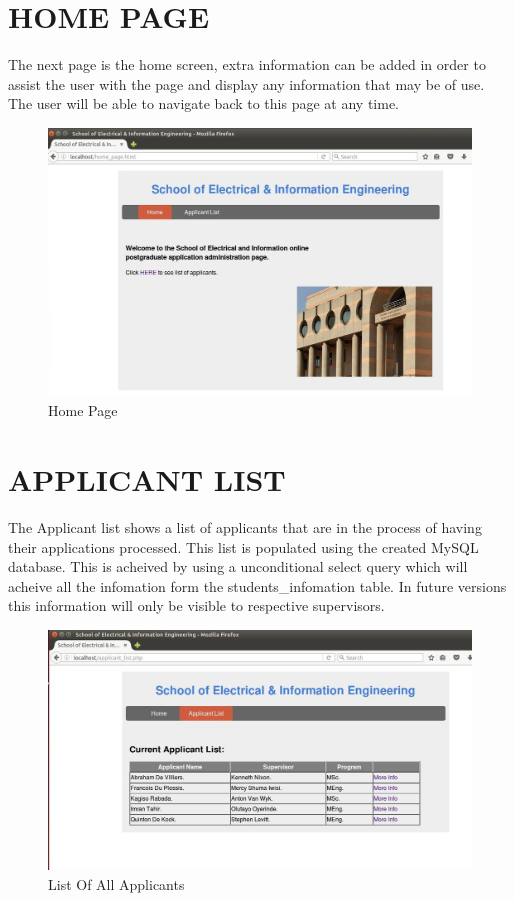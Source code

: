 \documentclass[journal,comsoc,onecolumn]{IEEEtran}
\begin{document}
\section{HOME PAGE}
The next page is the home screen, extra information can be added in order to assist the user with the page and display any information that may be of use. The user will be able to navigate back to this page at any time. 

\begin{figure}[h]
	\centering
	\includegraphics[width=0.7\linewidth]{home}
	\caption{Home Page}
	\label{fig:home}
\end{figure}
\section{APPLICANT LIST}
The Applicant list shows a list of applicants that are in the process of having their applications processed. This list is populated using the created MySQL database. This is acheived by using a unconditional select query which will acheive all the infomation form the students\_infomation table. In future versions this information will only be visible to respective supervisors. 

\begin{figure}[h]
\centering
\includegraphics[width=0.7\linewidth]{list}
\caption{List Of All Applicants}
\label{fig:list}
\end{figure}
\end{document}

